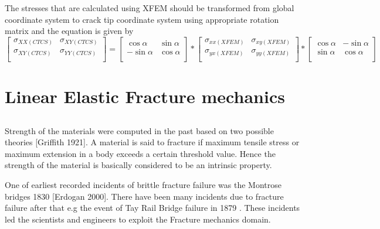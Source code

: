 \documentclass[fleqn, 12.5pt,a4paper]{report}
\begin{document}
The stresses that are calculated using XFEM should be transformed from global coordinate system to crack tip coordinate system using appropriate rotation matrix \cite{ahmed2009extended} and the equation is given by\vspace{0.1cm}
$$
\begin{bmatrix}
\sigma_{XX (CTCS)} & \sigma_{XY (CTCS)}\\
\sigma_{XY (CTCS)} & \sigma_{YY (CTCS)}\\
\end{bmatrix}
=
\begin{bmatrix}
\cos\alpha & \sin\alpha\\
-\sin\alpha & \cos\alpha\\
\end{bmatrix}
*
\begin{bmatrix}
\sigma_{xx (XFEM)} & \sigma_{xy (XFEM)}\\
\sigma_{yx (XFEM)} & \sigma_{yy (XFEM)}\\
\end{bmatrix}
*
\begin{bmatrix}
\cos\alpha & -\sin\alpha\\
\sin\alpha & \cos\alpha\\
\end{bmatrix}
$$\vspace{0.1cm}

\section{\color{Black} \large{Linear Elastic Fracture mechanics}}
\subsection{\color{Black}{Introduction}}

Strength of the materials were computed in the past based on two possible theories [Griffith 1921]. A material is said to fracture if maximum tensile stress or maximum extension in a body exceeds a certain threshold value\cite{kuna2013finite}. Hence the strength of the material is basically considered to be an intrinsic property. \newline

One of earliest recorded incidents of brittle fracture failure was the Montrose bridges 1830 [Erdogan 2000]. There have been many incidents due to fracture failure after that e.g the event of Tay Rail Bridge failure in 1879 \cite{kuna2013finite}. These incidents led the scientists and engineers to exploit the Fracture mechanics domain. \newline
\end{document}

